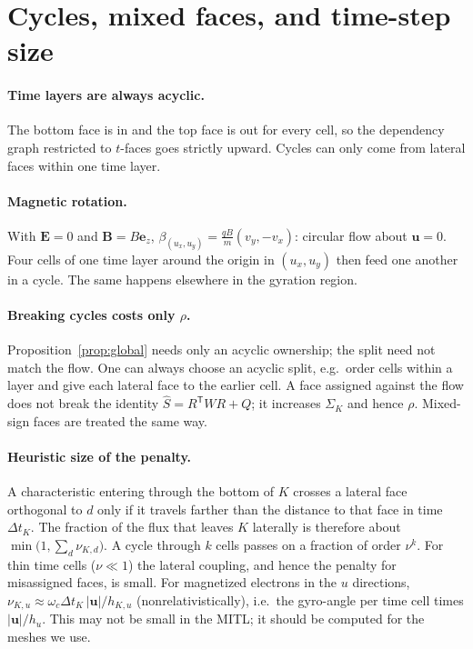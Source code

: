 \documentclass[11pt]{article}
\theoremstyle{remark}
\theoremstyle{definition}
\newcommand{\bu}{\boldsymbol{u}}
\newcommand{\bE}{\boldsymbol{E}}
\newcommand{\bB}{\boldsymbol{B}}
\newcommand{\Shat}{\widehat{S}}
\newcommand{\T}{\mathsf{T}}
\begin{document}
\section{Cycles, mixed faces, and time-step size}\label{sec:cycles}

\paragraph{Time layers are always acyclic.}  The bottom face is in and the top face is out for every cell, so the
dependency graph restricted to $t$-faces goes strictly upward.  Cycles can only come from lateral faces within one
time layer.

\paragraph{Magnetic rotation.}  With $\bE=0$ and $\bB=B\mathbf e_z$, $\beta_{(u_x,u_y)}=\frac{qB}{m}(v_y,-v_x)$:
circular flow about $\bu=0$.  Four cells of one time layer around the origin in $(u_x,u_y)$ then feed one another in a
cycle.  The same happens elsewhere in the gyration region.

\paragraph{Breaking cycles costs only $\rho$.}  Proposition~\ref{prop:global} needs only an acyclic ownership; the
split need not match the flow.  One can always choose an acyclic split, e.g.\ order cells within a layer and give each
lateral face to the earlier cell.  A face assigned against the flow does not break the identity
$\Shat=R^\T WR+Q$; it increases $\Sigma_K$ and hence $\rho$.  Mixed-sign faces are treated the same way.

\paragraph{Heuristic size of the penalty.}  A characteristic entering through the bottom of $K$ crosses a lateral
face orthogonal to $d$ only if it travels farther than the distance to that face in time $\Delta t_K$.  The fraction of
the flux that leaves $K$ laterally is therefore about $\min\bigl(1,\sum_d\nu_{K,d}\bigr)$.  A cycle through $k$ cells
passes on a fraction of order $\nu^k$.  For thin time cells ($\nu\ll1$) the lateral coupling, and hence the penalty for
misassigned faces, is small.  For magnetized electrons in the $u$ directions,
$\nu_{K,u}\approx\omega_c\Delta t_K\,|\bu|/h_{K,u}$ (nonrelativistically), i.e.\ the gyro-angle per time cell times
$|\bu|/h_u$.  This may not be small in the MITL; it should be computed for the meshes we use.
\end{document}
